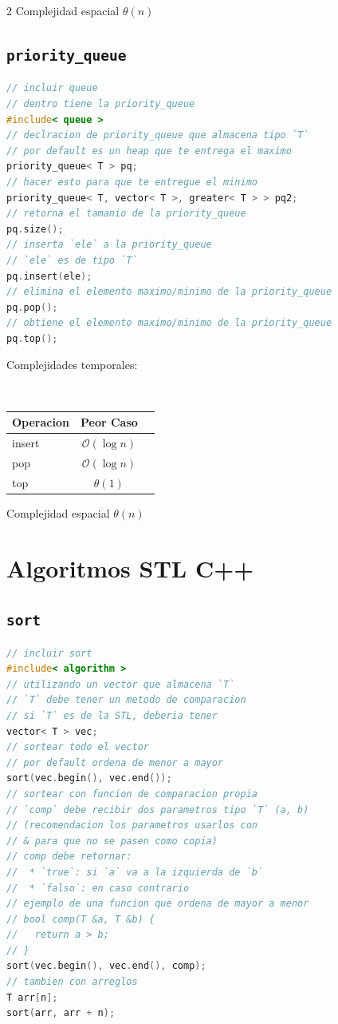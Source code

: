\documentclass{article}
\newcommand{\bigO}{\mathcal{O}}
\begin{document}
\begin{multicols}{2}
Complejidad espacial $\theta(n)$

\subsection*{\tt \footnotesize priority\_queue}

\begin{lstlisting}[language=C++]
// incluir queue
// dentro tiene la priority_queue
#include< queue >
// declracion de priority_queue que almacena tipo `T`
// por default es un heap que te entrega el maximo
priority_queue< T > pq;
// hacer esto para que te entregue el minimo
priority_queue< T, vector< T >, greater< T > > pq2;
// retorna el tamanio de la priority_queue
pq.size();
// inserta `ele` a la priority_queue
// `ele` es de tipo `T`
pq.insert(ele);
// elimina el elemento maximo/minimo de la priority_queue
pq.pop();
// obtiene el elemento maximo/minimo de la priority_queue
pq.top();
\end{lstlisting}

Complejidades temporales:
\begin{table}[H]
  \tt \scriptsize
  \begin{center}
    \begin{tabular}[c]{l|c|c}
      \hline
      Operacion & Peor Caso\\
      \hline
      insert & $\bigO(\log n)$\\
      \hline
      pop & $\bigO(\log n)$\\
      \hline
      top & $\theta(1)$\\
      \hline
    \end{tabular}
  \end{center}
\end{table}

Complejidad espacial $\theta(n)$

\section*{\small Algoritmos STL C++}

\subsection*{\tt \footnotesize sort}
\begin{lstlisting}[language=C++]
// incluir sort
#include< algorithm >
// utilizando un vector que almacena `T`
// `T` debe tener un metodo de comparacion
// si `T` es de la STL, deberia tener
vector< T > vec;
// sortear todo el vector
// por default ordena de menor a mayor
sort(vec.begin(), vec.end());
// sortear con funcion de comparacion propia
// `comp` debe recibir dos parametros tipo `T` (a, b)
// (recomendacion los parametros usarlos con 
// & para que no se pasen como copia)
// comp debe retornar:
//  * `true`: si `a` va a la izquierda de `b` 
//  * `falso`: en caso contrario
// ejemplo de una funcion que ordena de mayor a menor
// bool comp(T &a, T &b) {
//   return a > b;
// }
sort(vec.begin(), vec.end(), comp);
// tambien con arreglos
T arr[n];
sort(arr, arr + n);
\end{lstlisting}


\end{multicols}
\end{document}

